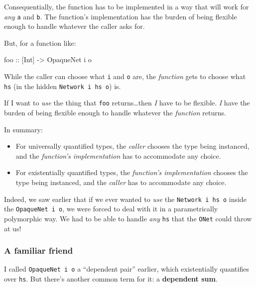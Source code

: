 \documentclass[]{article}
\newenvironment{Shaded}{}{}
\newcommand{\DataTypeTok}[1]{\textcolor[rgb]{0.56,0.13,0.00}{{#1}}}
\newcommand{\OtherTok}[1]{\textcolor[rgb]{0.00,0.44,0.13}{{#1}}}
\newcommand{\NormalTok}[1]{{#1}}
\begin{document}
Consequentially, the function has to be implemented in a way that will work for
\emph{any} \texttt{a} and \texttt{b}. The function's implementation has the
burden of being flexible enough to handle whatever the caller asks for.

But, for a function like:

\begin{Shaded}
\begin{Highlighting}[]
\OtherTok{foo ::} \NormalTok{[}\DataTypeTok{Int}\NormalTok{] }\OtherTok{->} \DataTypeTok{OpaqueNet} \NormalTok{i o}
\end{Highlighting}
\end{Shaded}

While the caller can choose what \texttt{i} and \texttt{o} are, the
\emph{function} gets to choose what \texttt{hs} (in the hidden
\texttt{Network\ i\ hs\ o}) is.

If I want to \emph{use} the thing that \texttt{foo} returns\ldots{}then \emph{I}
have to be flexible. \emph{I} have the burden of being flexible enough to handle
whatever the \emph{function} returns.

In summary:

\begin{itemize}
\item
  For universally quantified types, the \emph{caller} chooses the type being
  instanced, and the \emph{function's implementation} has to accommodate any
  choice.
\item
  For existentially quantified types, the \emph{function's implementation}
  chooses the type being instanced, and the \emph{caller} has to accommodate any
  choice.
\end{itemize}

Indeed, we saw earlier that if we ever wanted to \emph{use} the
\texttt{Network\ i\ hs\ o} inside the \texttt{OpaqueNet\ i\ o}, we were forced
to deal with it in a parametrically polymorphic way. We had to be able to handle
\emph{any} \texttt{hs} that the \texttt{ONet} could throw at us!

\subsubsection{A familiar friend}\label{a-familiar-friend}

I called \texttt{OpaqueNet\ i\ o} a ``dependent pair'' earlier, which
existentially quantifies over \texttt{hs}. But there's another common term for
it: a \textbf{dependent sum}.
\end{document}

